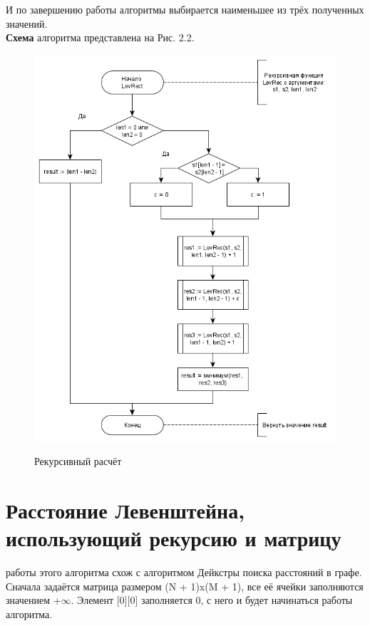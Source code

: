 \documentclass[12pt]{report}
\begin{document}
И по завершению работы алгоритмы выбирается наименьшее из трёх полученных значений. \\

\textbf{Схема} алгоритма представлена на Рис. 2.2.

\begin{figure}[h]
	\begin{center}
		{\includegraphics[scale = 0.75]{LevRec}}
		\caption{Рекурсивный расчёт}
	\end{center}
\end{figure}

\section{Расстояние Левенштейна, использующий рекурсию и матрицу}
 работы этого алгоритма схож с алгоритмом Дейкстры поиска расстояний в графе. \\

Сначала задаётся матрица размером (N + 1)x(M + 1), все её ячейки заполняются значением +{$\infty$}. Элемент [0][0] заполняется 0, с него и будет начинаться работы алгоритма.\\
\end{document}
